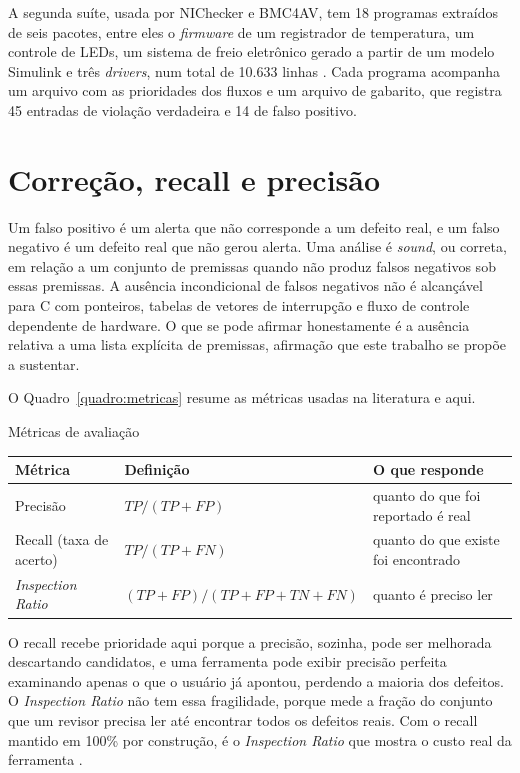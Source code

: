 A segunda suíte, usada por NIChecker e BMC4AV, tem 18 programas extraídos de
seis pacotes, entre eles o \textit{firmware} de um registrador de temperatura,
um controle de LEDs, um sistema de freio eletrônico gerado a partir de um
modelo Simulink e três \textit{drivers}, num total de 10.633 linhas
\cite{nichecker,bmc4av}. Cada programa acompanha um arquivo com as prioridades
dos fluxos e um arquivo de gabarito, que registra 45 entradas de violação
verdadeira e 14 de falso positivo.

\section{Correção, recall e precisão}
\label{sec:soundness}

Um falso positivo é um alerta que não corresponde a um defeito real, e um falso
negativo é um defeito real que não gerou alerta. Uma análise é \textit{sound},
ou correta, em relação a um conjunto de premissas quando não produz falsos
negativos sob essas premissas. A ausência incondicional de falsos negativos não
é alcançável para C com ponteiros, tabelas de vetores de interrupção e fluxo de
controle dependente de hardware. O que se pode afirmar honestamente é a
ausência relativa a uma lista explícita de premissas, afirmação que este
trabalho se propõe a sustentar.

O Quadro~\ref{quadro:metricas} resume as métricas usadas na literatura e aqui.

\begin{quadro}[htb]
  \caption{\label{quadro:metricas}Métricas de avaliação}
  \small
  \begin{tabular}{|L{3.0cm}|L{6.4cm}|L{4.4cm}|}
    \hline
    Métrica & Definição & O que responde \\
    \hline
    Precisão & $TP / (TP + FP)$ & quanto do que foi reportado é real \\
    \hline
    Recall (taxa de acerto) & $TP / (TP + FN)$ & quanto do que existe foi encontrado \\
    \hline
    \textit{Inspection Ratio} & $(TP + FP) / (TP + FP + TN + FN)$ & quanto é preciso ler \\
    \hline
  \end{tabular}
\end{quadro}

O recall recebe prioridade aqui porque a precisão, sozinha, pode ser melhorada
descartando candidatos, e uma ferramenta pode exibir
precisão perfeita examinando apenas o que o usuário já apontou, perdendo a
maioria dos defeitos. O \textit{Inspection Ratio} não tem essa fragilidade,
porque mede a fração do conjunto que um revisor precisa ler até encontrar todos
os defeitos reais. Com o recall mantido em 100\% por construção, é o
\textit{Inspection Ratio} que mostra o custo real da ferramenta
\cite{reducing-fp}.

